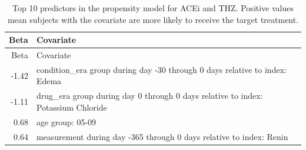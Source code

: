 \documentclass[]{book}
\begin{document}
\begin{longtable}[]{@{}rl@{}}
\caption{\label{tab:psModel} Top 10 predictors in the propensity model for
ACEi and THZ. Positive values mean subjects with the covariate are more
likely to receive the target treatment.}\tabularnewline
\toprule
\begin{minipage}[b]{0.07\columnwidth}\raggedleft\strut
Beta\strut
\end{minipage} & \begin{minipage}[b]{0.87\columnwidth}\raggedright\strut
Covariate\strut
\end{minipage}\tabularnewline
\midrule
\endfirsthead
\toprule
\begin{minipage}[b]{0.07\columnwidth}\raggedleft\strut
Beta\strut
\end{minipage} & \begin{minipage}[b]{0.87\columnwidth}\raggedright\strut
Covariate\strut
\end{minipage}\tabularnewline
\midrule
\endhead
\begin{minipage}[t]{0.07\columnwidth}\raggedleft\strut
-1.42\strut
\end{minipage} & \begin{minipage}[t]{0.87\columnwidth}\raggedright\strut
condition\_era group during day -30 through 0 days relative to index:
Edema\strut
\end{minipage}\tabularnewline
\begin{minipage}[t]{0.07\columnwidth}\raggedleft\strut
-1.11\strut
\end{minipage} & \begin{minipage}[t]{0.87\columnwidth}\raggedright\strut
drug\_era group during day 0 through 0 days relative to index: Potassium
Chloride\strut
\end{minipage}\tabularnewline
\begin{minipage}[t]{0.07\columnwidth}\raggedleft\strut
0.68\strut
\end{minipage} & \begin{minipage}[t]{0.87\columnwidth}\raggedright\strut
age group: 05-09\strut
\end{minipage}\tabularnewline
\begin{minipage}[t]{0.07\columnwidth}\raggedleft\strut
0.64\strut
\end{minipage} & \begin{minipage}[t]{0.87\columnwidth}\raggedright\strut
measurement during day -365 through 0 days relative to index:
Renin\strut
\end{minipage}\tabularnewline

\end{longtable}
\end{document}
